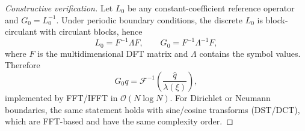 \documentclass[10pt,a4paper]{amsart}
\begin{document}
\begin{proof}[Constructive verification]
Let $L_0$ be any constant-coefficient reference operator and $G_0=L_0^{-1}$. Under periodic boundary conditions, the discrete $L_0$ is block-circulant with circulant blocks, hence
\[
L_0 = F^{-1}\Lambda F,\qquad
G_0 = F^{-1}\Lambda^{-1}F,
\]
where $F$ is the multidimensional DFT matrix and $\Lambda$ contains the symbol values. Therefore
\[
G_0 q = \mathcal{F}^{-1}\!\left(\frac{\widehat{q}}{\lambda(\xi)}\right),
\]
implemented by FFT/IFFT in $\mathcal{O}(N\log N)$.
For Dirichlet or Neumann boundaries, the same statement holds with sine/cosine transforms (DST/DCT), which are FFT-based and have the same complexity order.
\end{proof}
\end{document}
